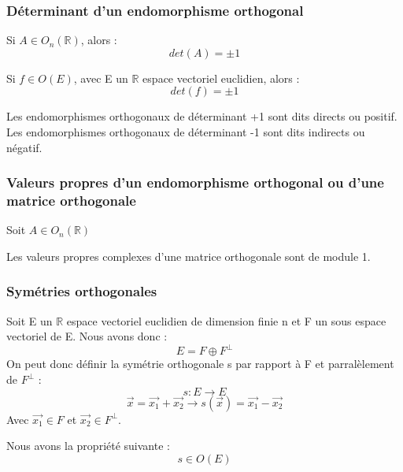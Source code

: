 \subsubsection{Déterminant d'un endomorphisme orthogonal}
\begin{prop}
Si $A \in O_n(\mathbb{R})$, alors : 
$$det(A) = \pm 1$$
\end{prop}
\begin{prop}
Si $f \in O(E)$, avec E un $\mathbb{R}$ espace vectoriel euclidien, alors :
$$det(f) = \pm 1$$
\end{prop}
\begin{prop}
Les endomorphismes orthogonaux de déterminant +1 sont dits directs ou positif.\\
Les endomorphismes orthogonaux de déterminant -1 sont dits indirects ou négatif.\\
\end{prop}
\subsubsection{Valeurs propres d'un endomorphisme orthogonal ou d'une matrice orthogonale}
Soit $A \in O_n(\mathbb{R})$
\begin{prop}
Les valeurs propres complexes d'une matrice orthogonale sont de module 1.
\end{prop}
\subsubsection{Symétries orthogonales}
\begin{de}
Soit E un $\mathbb{R}$ espace vectoriel euclidien de dimension finie n et F un sous espace vectoriel de E. Nous avons donc : 
$$E = F \oplus F^{\bot}$$
On peut donc définir la symétrie orthogonale s par rapport à F et parralèlement de $F^{\bot}$ : 
$$s : E \rightarrow E$$
$$\overrightarrow{x} = \overrightarrow{x_1} + \overrightarrow{x_2} \rightarrow s(\overrightarrow{x}) = \overrightarrow{x_1} - \overrightarrow{x_2}$$
Avec $\overrightarrow{x_1} \in F$ et $\overrightarrow{x_2} \in F^{\bot}$.
\end{de}
\begin{prop}
Nous avons la propriété suivante : 
$$s \in O(E)$$
\end{prop}

